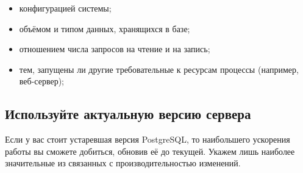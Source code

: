 \begin{itemize}
  \item конфигурацией системы;
  \item объёмом и типом данных, хранящихся в базе;
  \item отношением числа запросов на чтение и на запись;
  \item тем, запущены ли другие требовательные к ресурсам процессы (например, веб-сервер);
\end{itemize}


\subsection{Используйте актуальную версию сервера}

Если у вас стоит устаревшая версия PostgreSQL, то наибольшего ускорения работы вы сможете добиться, обновив её до текущей. Укажем лишь наиболее значительные из связанных с производительностью изменений.

